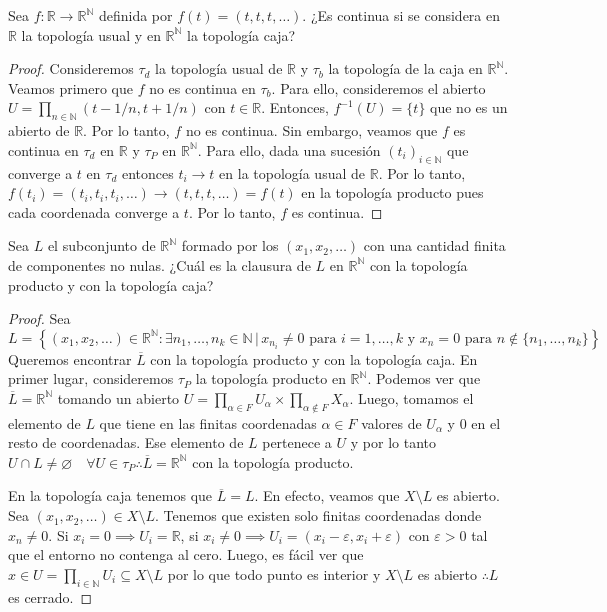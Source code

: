 \documentclass{article}
\theoremstyle{plain}
\theoremstyle{definition}
\newcommand{\R}{\mathbb{R}}
\newcommand{\N}{\mathbb{N}}
\newcommand{\cl}[1]{\overline{#1}}              %
\newenvironment{ejercicio}[1]{\begin{trivlist}
\item[\hskip \labelsep {\bfseries Ejercicio}\hskip \labelsep {\bfseries #1.}]}{\end{trivlist}}
\begin{document}
\clearpage

\begin{ejercicio}{3}
    Sea \( f : \R \to \R^{\N} \) definida por \( f(t) = (t, t, t, \ldots) \). ¿Es continua si se considera en \( \R \) la topología usual y en \( \R^{\N} \) la topología caja?
\end{ejercicio}
\begin{proof}
    Consideremos \( \tau_d \) la topología usual de \( \R \) y \( \tau_b \) la topología de la caja en \( \R^{\N} \).
    Veamos primero que \( f \) no es continua en \( \tau_b \). Para ello, consideremos el abierto \( U = \prod_{n \in \N} (t - 1/n, t + 1/n) \) con \( t \in \R \). Entonces, \( f^{-1}(U) = \{t\} \) que no es un abierto de \( \R \). Por lo tanto, \( f \) no es continua.
    Sin embargo, veamos que \( f \) es continua en \( \tau_d \) en \( \R \) y \( \tau_P \) en \( \R^{\N} \). Para ello, dada una sucesión \( {(t_i)}_{i \in \N} \) que converge a \( t \) en \( \tau_d \) entonces \( t_i \to t \) en la topología usual de \( \R \). Por lo tanto, \( f(t_i) = (t_i, t_i, t_i, \ldots) \to (t, t, t, \ldots) = f(t) \) en la topología producto pues cada coordenada converge a \( t \). Por lo tanto, \( f \) es continua.
\end{proof}

\begin{ejercicio}{4}
    Sea \( L \) el subconjunto de \( \R^{\N} \) formado por los \( (x_1, x_2, \ldots) \) con una cantidad finita de componentes no nulas. ¿Cuál es la clausura de \( L \) en \( \R^{\N} \) con la topología producto y con la topología caja?
\end{ejercicio}
\begin{proof}
    Sea \[ L = \left \{ (x_1, x_2, \ldots) \in \R^\N : \exists n_1, \ldots, n_k \in \N \, | \, x_{n_i} \neq 0 \text { para } i = 1, \ldots, k \text{ y } x_n = 0 \text{ para } n \notin \{n_1, \ldots, n_k\} \right \} \]
    Queremos encontrar \( \cl{L} \) con la topología producto y con la topología caja.
    En primer lugar, consideremos \( \tau_P \) la topología producto en \( \R^\N \). Podemos ver que \( \cl{L} = \R^\N \) tomando un abierto \( U = \prod_{\alpha \in F} U_\alpha \times \prod_{\alpha \notin F} X_\alpha \).
    Luego, tomamos el elemento de \( L \) que tiene en las finitas coordenadas \( \alpha \in F \) valores de \( U_\alpha \) y \( 0 \) en el resto de coordenadas.
    Ese elemento de \( L \) pertenece a \( U \) y por lo tanto \( U \cap L \neq \varnothing \quad \forall U \in \tau_P \therefore \cl{L} = \R^\N \) con la topología producto.

    En la topología caja tenemos que \( \cl{L} = L \). En efecto, veamos que \( X \setminus L \) es abierto. Sea \( (x_1, x_2, \ldots) \in X \setminus L \).
    Tenemos que existen solo finitas coordenadas donde \( x_n \neq 0 \). Si \( x_i = 0 \implies U_i = \R \), si \( x_i \neq 0 \implies U_i = (x_i - \varepsilon, x_i + \varepsilon) \) con \( \varepsilon > 0 \) tal que el entorno no contenga al cero.
    Luego, es fácil ver que \( x \in U = \prod_{i \in \N} U_i \subseteq X \setminus L \) por lo que todo punto es interior y \( X \setminus L \) es abierto \( \therefore L \) es cerrado.
\end{proof}
\end{document}
